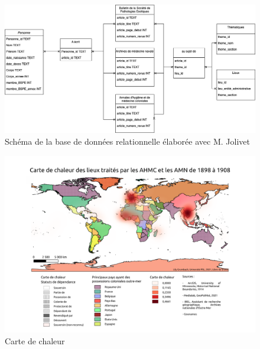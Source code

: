 \appendix
\renewcommand{\appendixpagename}{Annexes}
\appendixpage

\begin{figure}
    \centering
    \includegraphics[width=15cm]{./images/Schema-BDD-memoire}
    \caption{Schéma de la base de données relationnelle élaborée avec M. Jolivet}
    \label{Schema-BDD-memoire}
\end{figure}


\begin{figure}
    \centering
    \includegraphics[width=15cm]{./images/Carte_chaleur_AHMC-AMN}
    \caption{Carte de chaleur}
    \label{Schema-BDD-memoire}
\end{figure}



